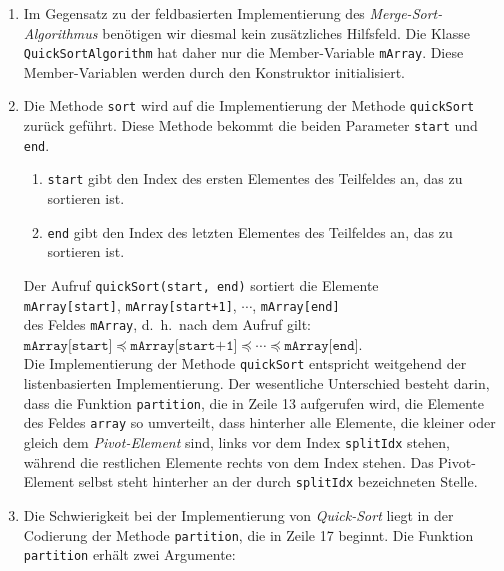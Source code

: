 \begin{enumerate}
\item Im Gegensatz zu der feldbasierten Implementierung des \emph{Merge-Sort-Algorithmus}
      ben\"otigen wir diesmal kein zus\"atzliches Hilfsfeld.  Die Klasse
      \texttt{QuickSortAlgorithm} hat daher nur die Member-Variable
      \texttt{mArray}.  Diese Member-Variablen werden durch den 
      Konstruktor initialisiert.
\item Die Methode \texttt{sort} wird auf die Implementierung der Methode
      \texttt{quickSort} zur\"uck gef\"uhrt.  Diese Methode bekommt die beiden Parameter
      \texttt{start} und \texttt{end}.
      \begin{enumerate}
      \item \texttt{start} gibt den Index des ersten Elementes des Teilfeldes an,
            das zu sortieren ist.
      \item \texttt{end} gibt den Index des letzten Elementes des Teilfeldes an,
            das zu sortieren ist.  
      \end{enumerate}
      Der Aufruf \texttt{quickSort(start, end)} sortiert die Elemente \\[0.2cm]
      \hspace*{1.3cm} 
      \texttt{mArray[start]}, \texttt{mArray[start+1]}, $\cdots$, \texttt{mArray[end]}
      \\[0.2cm]
      des Feldes \texttt{mArray}, d.~h.~nach dem Aufruf gilt:\\[0.2cm]
      \hspace*{1.3cm}
      $\texttt{mArray[start]}\preceq\texttt{mArray[start+1]}\preceq\cdots\preceq\texttt{mArray[end]}$.
      \\[0.2cm]
      Die Implementierung der Methode \texttt{quickSort}
      entspricht weitgehend der listenbasierten Implementierung.  Der
      wesentliche Unterschied besteht darin, dass die Funktion \texttt{partition},
      die in Zeile 13 aufgerufen wird,  die
      Elemente des Feldes \texttt{array} so umverteilt, dass hinterher alle Elemente,
      die kleiner oder gleich dem \emph{Pivot-Element} sind, links vor dem
      Index \texttt{splitIdx} stehen, w\"ahrend die restlichen Elemente rechts von dem Index stehen.
      Das Pivot-Element selbst steht hinterher an der durch \texttt{splitIdx}
      bezeichneten Stelle.
\item Die Schwierigkeit bei der Implementierung von \emph{Quick-Sort} liegt
      in der Codierung der Methode \texttt{partition}, die in Zeile 17 beginnt.
      Die Funktion \texttt{partition} erh\"alt zwei Argumente:

\end{enumerate}
